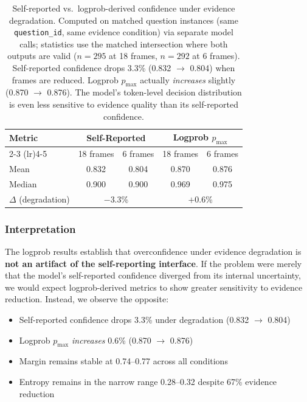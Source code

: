 \documentclass{article}
\begin{document}
\begin{table}[h]
\centering
\small
\begin{tabular}{lcccc}
\toprule
\textbf{Metric} & \multicolumn{2}{c}{\textbf{Self-Reported}} & \multicolumn{2}{c}{\textbf{Logprob $p_{\max}$}} \\
\cmidrule(lr){2-3} \cmidrule(lr){4-5}
 & 18 frames & 6 frames & 18 frames & 6 frames \\
\midrule
Mean & 0.832 & 0.804 & 0.870 & 0.876 \\
Median & 0.900 & 0.900 & 0.969 & 0.975 \\
$\Delta$ (degradation) & \multicolumn{2}{c}{$-$3.3\%} & \multicolumn{2}{c}{$+$0.6\%} \\
\bottomrule
\end{tabular}
\caption{Self-reported vs.\ logprob-derived confidence under evidence degradation. Computed on matched question instances (same \texttt{question\_id}, same evidence condition) via separate model calls; statistics use the matched intersection where both outputs are valid ($n=295$ at 18 frames, $n=292$ at 6 frames). Self-reported confidence drops 3.3\% (0.832 $\to$ 0.804) when frames are reduced. Logprob $p_{\max}$ actually \emph{increases} slightly (0.870 $\to$ 0.876). The model's token-level decision distribution is even less sensitive to evidence quality than its self-reported confidence.}
\label{tab:confidence-comparison}
\end{table}

\subsubsection{Interpretation}

The logprob results establish that overconfidence under evidence degradation is \textbf{not an artifact of the self-reporting interface}. If the problem were merely that the model's self-reported confidence diverged from its internal uncertainty, we would expect logprob-derived metrics to show greater sensitivity to evidence reduction. Instead, we observe the opposite:

\begin{itemize}
    \item Self-reported confidence drops 3.3\% under degradation (0.832 $\to$ 0.804)
    \item Logprob $p_{\max}$ \emph{increases} 0.6\% (0.870 $\to$ 0.876)
    \item Margin remains stable at 0.74--0.77 across all conditions
    \item Entropy remains in the narrow range 0.28--0.32 despite 67\% evidence reduction
\end{itemize}
\end{document}
